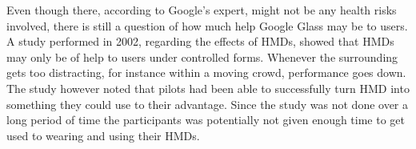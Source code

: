 %
%
Even though there, according to Google's expert, might not be any health risks involved, there is still a question of how much help Google Glass may be to users. A study performed in 2002\cite{laramee02}, regarding the effects of HMDs, showed that HMDs may only be of help to users under controlled forms. Whenever the surrounding gets too distracting, for instance within a moving crowd, performance goes down. The study however noted that pilots had been able to successfully turn HMD into something they could use to their advantage. Since the study was not done over a long period of time the participants was potentially not given enough time to get used to wearing and using their HMDs.

